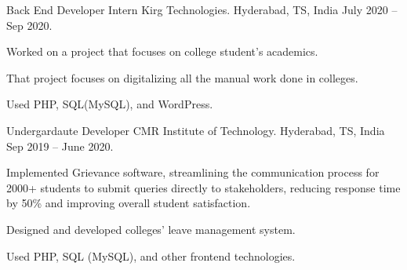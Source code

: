 \begin{cventries}
{\begin{cvitems}
      \end{cvitems}
    }
     \cventry
    {Back End Developer Intern} %
    {Kirg Technologies.} %
    {Hyderabad, TS, India} %
    {July 2020 – Sep 2020.} %
    {
      \begin{cvitems} %
        \item {Worked on a project that focuses on college student's academics.}
        \item  {That project focuses on digitalizing all the manual work done in colleges.}
        \item {Used PHP, SQL(MySQL), and WordPress.}
      \end{cvitems}
    }
     \cventry
    {Undergardaute Developer} %
    {CMR Institute of Technology.} %
    {Hyderabad, TS, India} %
    {Sep 2019 – June 2020.} %
    {
      \begin{cvitems} %
        \item {Implemented Grievance software, streamlining the communication process for 2000+ students to submit queries directly to stakeholders, reducing response time by 50\% and improving overall student satisfaction.}
        \item {Designed and developed colleges' leave management system.}
        \item {Used PHP, SQL (MySQL), and other frontend technologies.}
      \end{cvitems}
    }



\end{cventries}
